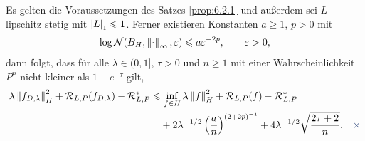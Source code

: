 \begin{cor}
\label{prop:6.2.2}
Es gelten die Voraussetzungen des Satzes \ref{prop:6.2.1} und außerdem sei $L$
lipschitz stetig mit $\left|L\right|_1 \leqslant 1$. Ferner existieren Konstanten $a\ge 1$,
$p > 0$ mit
\begin{align*}
\log \mathcal{N}(B_H,\left\|\cdot\right\|_\infty,\varepsilon) \leqslant a \varepsilon^{-2p},\qquad \varepsilon > 0,
\end{align*}
dann folgt, dass für alle $\lambda\in (0,1]$, $\tau > 0$ und $n\ge 1$ mit einer
Wahrscheinlichkeit $P^n$ nicht kleiner als $1-e^{-\tau}$ gilt,
\begin{align*}
\lambda\norm{f_{D,\lambda}}_H^2 + \RR_{L,P}(f_{D,\lambda})
- \RR_{L,P}^* &\le
\inf_{f\in H} \lambda\norm{f}_H^2 + \RR_{L,P}(f) - \RR_{L,P}^*\\
&\quad + 2\lambda^{-1/2}\left(\frac{a}{n}\right)^{(2+2p)^{-1}}
+ 4\lambda^{-1/2}\sqrt{\frac{2\tau+2}{n}}.\fishhere
\end{align*}
\end{cor}
